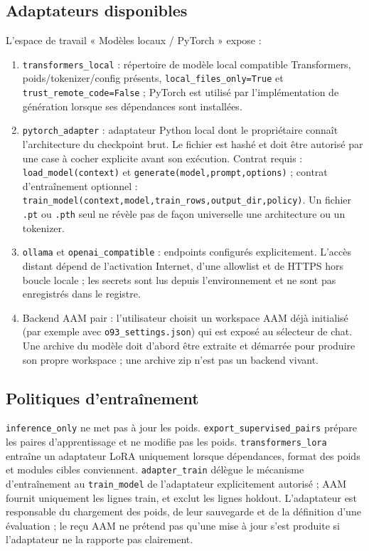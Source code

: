 \documentclass[11pt,a4paper]{article}
\begin{document}
\subsection{Adaptateurs disponibles}
L'espace de travail « Modèles locaux / PyTorch » expose :
\begin{enumerate}[leftmargin=1.5em]
  \item \verb|transformers_local| : répertoire de modèle local compatible Transformers, poids/tokenizer/config présents, \verb|local_files_only=True| et \verb|trust_remote_code=False| ; PyTorch est utilisé par l'implémentation de génération lorsque ses dépendances sont installées.
  \item \verb|pytorch_adapter| : adaptateur Python local dont le propriétaire connaît l'architecture du checkpoint brut. Le fichier est hashé et doit être autorisé par une case à cocher explicite avant son exécution. Contrat requis : \verb|load_model(context)| et \verb|generate(model,prompt,options)| ; contrat d'entraînement optionnel : \verb|train_model(context,model,train_rows,output_dir,policy)|. Un fichier \verb|.pt| ou \verb|.pth| seul ne révèle pas de façon universelle une architecture ou un tokenizer.
  \item \verb|ollama| et \verb|openai_compatible| : endpoints configurés explicitement. L'accès distant dépend de l'activation Internet, d'une allowlist et de HTTPS hors boucle locale ; les secrets sont lus depuis l'environnement et ne sont pas enregistrés dans le registre.
  \item Backend AAM pair : l'utilisateur choisit un workspace AAM déjà initialisé (par exemple avec \verb|o93_settings.json|) qui est exposé au sélecteur de chat. Une archive du modèle doit d'abord être extraite et démarrée pour produire son propre workspace ; une archive zip n'est pas un backend vivant.
\end{enumerate}

\subsection{Politiques d'entraînement}
\verb|inference_only| ne met pas à jour les poids. \verb|export_supervised_pairs| prépare les paires d'apprentissage et ne modifie pas les poids. \verb|transformers_lora| entraîne un adaptateur LoRA uniquement lorsque dépendances, format des poids et modules cibles conviennent. \verb|adapter_train| délègue le mécanisme d'entraînement au \verb|train_model| de l'adaptateur explicitement autorisé ; AAM fournit uniquement les lignes train, et exclut les lignes holdout. L'adaptateur est responsable du chargement des poids, de leur sauvegarde et de la définition d'une évaluation ; le reçu AAM ne prétend pas qu'une mise à jour s'est produite si l'adaptateur ne la rapporte pas clairement.
\end{document}
